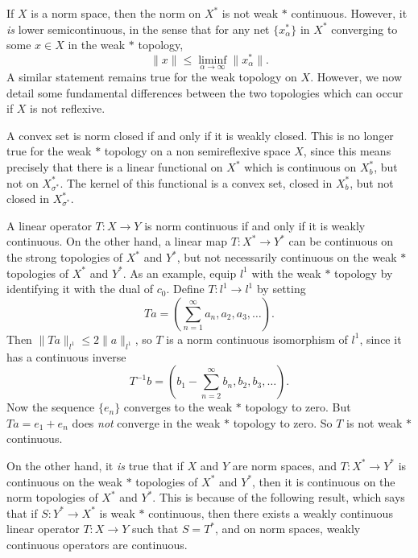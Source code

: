 If $X$ is a norm space, then the norm on $X^*$ is not weak $*$ continuous. However, it \emph{is} lower semicontinuous, in the sense that for any net $\{ x_\alpha^* \}$ in $X^*$ converging to some $x \in X$ in the weak $*$ topology,
%
\[ \| x \| \leq \liminf_{\alpha \to \infty} \| x_\alpha^* \|. \]
%
A similar statement remains true for the weak topology on $X$. However, we now detail some fundamental differences between the two topologies which can occur if $X$ is not reflexive.

\begin{example}
    A convex set is norm closed if and only if it is weakly closed. This is no longer true for the weak $*$ topology on a non semireflexive space $X$, since this means precisely that there is a linear functional on $X^*$ which is continuous on $X^*_b$, but not on $X^*_{\sigma^*}$. The kernel of this functional is a convex set, closed in $X^*_b$, but not closed in $X^*_{\sigma^*}$.
\end{example}

\begin{example}
    A linear operator $T: X \to Y$ is norm continuous if and only if it is weakly continuous. On the other hand, a linear map $T: X^* \to Y^*$ can be continuous on the strong topologies of $X^*$ and $Y^*$, but not necessarily continuous on the weak $*$ topologies of $X^*$ and $Y^*$. As an example, equip $l^1$ with the weak $*$ topology by identifying it with the dual of $c_0$. Define $T: l^1 \to l^1$ by setting
    \[ Ta = \left( \sum_{n = 1}^\infty a_n, a_2, a_3, \dots \right). \]
    Then $\| Ta \|_{l^1} \leq 2 \| a \|_{l^1}$, so $T$ is a norm continuous isomorphism of $l^1$, since it has a continuous inverse
    \[ T^{-1}b = \left( b_1 - \sum_{n = 2}^\infty b_n, b_2, b_3, \dots \right). \]
    Now the sequence $\{ e_n \}$ converges to the weak $*$ topology to zero. But $Ta = e_1 + e_n$ does \emph{not} converge in the weak $*$ topology to zero. So $T$ is not weak $*$ continuous.
\end{example}

On the other hand, it \emph{is} true that if $X$ and $Y$ are norm spaces, and $T: X^* \to Y^*$ is continuous on the weak $*$ topologies of $X^*$ and $Y^*$, then it is continuous on the norm topologies of $X^*$ and $Y^*$. This is because of the following result, which says that if $S: Y^* \to X^*$ is weak $*$ continuous, then there exists a weakly continuous linear operator $T: X \to Y$ such that $S = T^*$, and on norm spaces, weakly continuous operators are continuous.

